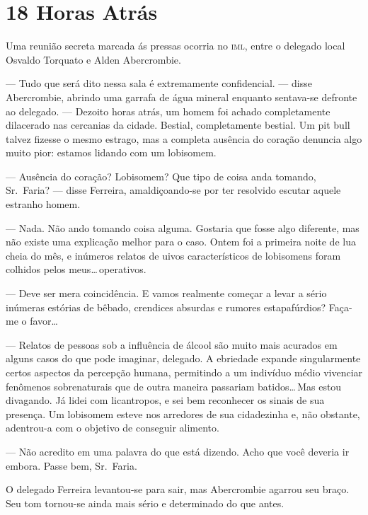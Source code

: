 \chapter{18 Horas Atrás}


Uma reunião secreta marcada ás pressas ocorria no \textsc{iml}, entre o
delegado local Osvaldo Torquato e Alden Abercrombie.

--- Tudo que será dito nessa sala é extremamente confidencial. --- disse
Abercrombie, abrindo uma garrafa de água mineral enquanto sentava-se
defronte ao delegado. --- Dezoito horas atrás, um homem foi achado
completamente dilacerado nas cercanias da cidade. Bestial, completamente
bestial. Um pit bull talvez fizesse o mesmo estrago, mas a completa
ausência do coração denuncia algo muito pior: estamos lidando com um
lobisomem.

--- Ausência do coração? Lobisomem? Que tipo de coisa anda tomando,
Sr.~Faria? --- disse Ferreira, amaldiçoando-se por ter resolvido escutar
aquele estranho homem.

--- Nada. Não ando tomando coisa alguma. Gostaria que fosse algo
diferente, mas não existe uma explicação melhor para o caso. Ontem foi a
primeira noite de lua cheia do mês, e inúmeros relatos de uivos
característicos de lobisomens foram colhidos pelos
meus\ldots\,operativos.

--- Deve ser mera coincidência. E vamos realmente começar a levar a
sério inúmeras estórias de bêbado, crendices absurdas e rumores
estapafúrdios? Faça-me o favor\ldots

--- Relatos de pessoas sob a influência de álcool são muito mais
acurados em alguns casos do que pode imaginar, delegado. A ebriedade
expande singularmente certos aspectos da percepção humana, permitindo a
um indivíduo médio vivenciar fenômenos sobrenaturais que de outra
maneira passariam batidos\ldots\,Mas estou divagando. Já lidei com
licantropos, e sei bem reconhecer os sinais de sua presença. Um
lobisomem esteve nos arredores de sua cidadezinha e, não obstante,
adentrou-a com o objetivo de conseguir alimento.

--- Não acredito em uma palavra do que está dizendo. Acho que você
deveria ir embora. Passe bem, Sr.~Faria.

O delegado Ferreira levantou-se para sair, mas Abercrombie agarrou seu
braço. Seu tom tornou-se ainda mais sério e determinado do que antes.

